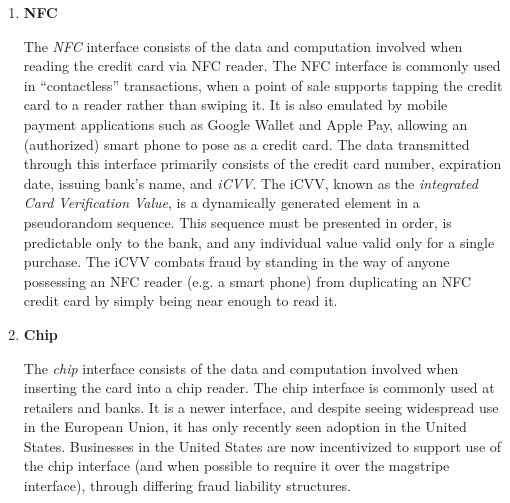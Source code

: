 \begin{enumerate}
\item \textbf{NFC}

The \emph{NFC} interface consists of the data and computation involved when reading the credit card via NFC reader.
The NFC interface is commonly used in ``contactless'' transactions, when a point of sale supports tapping the credit card to a reader rather than swiping it.
It is also emulated by mobile payment applications such as Google Wallet and Apple Pay, allowing an (authorized) smart phone to pose as a credit card.
The data transmitted through this interface primarily consists of the credit card number, expiration date, issuing bank's name, and \emph{iCVV}.
The iCVV, known as the \emph{integrated Card Verification Value}, is a dynamically generated element in a pseudorandom sequence.
This sequence must be presented in order, is predictable only to the bank, and any individual value valid only for a single purchase.
The iCVV combats fraud by standing in the way of anyone possessing an NFC reader (e.g. a smart phone) from duplicating an NFC credit card by simply being near enough to read it.

\item \textbf{Chip}

The \emph{chip} interface consists of the data and computation involved when inserting the card into a chip reader.
The chip interface is commonly used at retailers and banks.
It is a newer interface, and despite seeing widespread use in the European Union, it has only recently seen adoption in the United States.
Businesses in the United States are now incentivized to support use of the chip interface (and when possible to require it over the magstripe interface), through differing fraud liability structures.
\end{enumerate}
